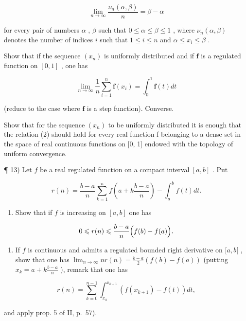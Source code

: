 \[
\lim _ {n \to \infty} \frac {\nu_ {n} (\alpha , \beta)}{n} = \beta - \alpha\tag{1}
\]

for every pair of numbers \(\alpha\) , \(\beta\) such that \(0 \leqslant \alpha \leqslant \beta \leqslant 1\) , where \(\nu_{n}(\alpha, \beta)\) denotes the number of indices \(i\) such that \(1 \leqslant i \leqslant n\) and \(\alpha \leqslant x_{i} \leqslant \beta\) .

Show that if the sequence \((x_{n})\) is uniformly distributed and if \(\mathbf{f}\) is a regulated function on \([0, 1]\) , one has

\[
\lim _ {n \rightarrow \infty} \frac {1}{n} \sum_ {i = 1} ^ {n} \mathbf {f} (x _ {i}) = \int_ {0} ^ {1} \mathbf {f} (t) d t\tag{2}
\]

(reduce to the case where \(\mathbf{f}\) is a step function). Converse.

Show that for the sequence \((x_{n})\) to be uniformly distributed it is enough that the relation (2) should hold for every real function f belonging to a dense set in the space of real continuous functions on {[}0, 1{]} endowed with the topology of uniform convergence.

¶ 13) Let \(f\) be a real regulated function on a compact interval \([a, b]\) . Put

\[
r (n) = \frac {b - a}{n} \sum_ {k = 1} ^ {n} f \left(a + k \frac {b - a}{n}\right) - \int_ {a} ^ {b} f (t) d t.
\]

\begin{enumerate}
\def\labelenumi{\alph{enumi})}
\tightlist
\item
  Show that if \(f\) is increasing on \([a, b]\) one has
\end{enumerate}

\[
0 \leqslant r (n) \leqslant \frac {b - a}{n} \Bigl (f (b) - f (a) \Bigr).
\]

\begin{enumerate}
\def\labelenumi{\alph{enumi})}
\setcounter{enumi}{1}
\tightlist
\item
  If \(f\) is continuous and admits a regulated bounded right derivative on \([a, b[\) , show that one has \(\lim_{n\to \infty}nr(n) = \frac{b - a}{2} (f(b) - f(a))\) (putting \(x_{k} = a + k\frac{b - a}{n}\) ), remark that one has
\end{enumerate}

\[
r (n) = \sum_ {k = 0} ^ {n - 1} \int_ {x _ {k}} ^ {x _ {k + 1}} \left(f (x _ {k + 1}) - f (t)\right) d t,
\]

and apply prop. 5 of II, p.~57).

